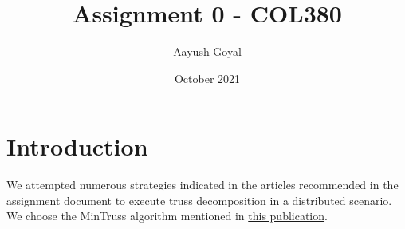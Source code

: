\documentclass{article}
\title{Assignment 0 - COL380}
\author{Aayush Goyal}
\date{October 2021}
\begin{document}
\maketitle

\tableofcontents


\section{Introduction}
We attempted numerous strategies indicated in the articles recommended in the assignment document to execute truss decomposition in a distributed scenario. We choose the MinTruss algorithm mentioned in \href{https://link.springer.com/chapter/10.1007/978-3-319-96983-1_50}{this publication}.
\end{document}
